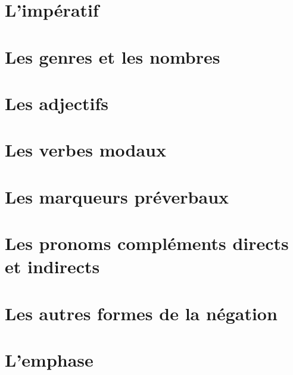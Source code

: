 \documentclass[draft]{book}
\begin{document}




\tableofcontents



















\chapter{L'impératif}

\chapter{Les genres et les nombres}

\chapter{Les adjectifs}



\chapter{Les verbes modaux}\label{VerbMod}

\chapter{Les marqueurs préverbaux}\label{MarqPVer}

\chapter{Les pronoms compléments directs et indirects} \label{PronCompl}

\chapter{Les autres formes de la négation}

\chapter{L'emphase}\label{Emphase}
\end{document}
